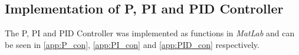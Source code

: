 \subsection{Implementation of P, PI and PID Controller}
The P, PI and PID Controller was implemented as functions in \textit{MatLab} and can be seen in \cref{app:P_con}, \cref{app:PI_con} and \cref{app:PID_con} respectively.